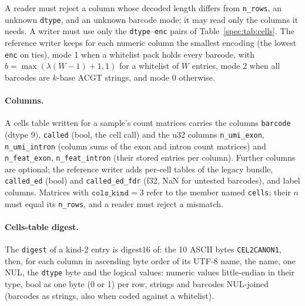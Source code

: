 A reader must reject a column whose decoded length differs from \texttt{n\_rows}, an unknown \texttt{dtype}, and an
unknown barcode mode; it may read only the columns it needs. A writer must use only the \texttt{dtype}--\texttt{enc}
pairs of Table~\ref{spec:tab:cells}. The reference writer keeps for each numeric column the smallest
encoding (the lowest \texttt{enc} on ties), mode 1 when a whitelist pack holds every barcode, with
$b=\max(\lambda(W-1)+1,1)$ for a whitelist of $W$ entries, mode 2 when all barcodes are $k$-base ACGT strings, and
mode 0 otherwise.

\paragraph{Columns.}
A cells table written for a sample's count matrices carries the columns \texttt{barcode} (dtype 9), \texttt{called}
(bool, the cell call) and the u32 columns \texttt{n\_umi\_exon}, \texttt{n\_umi\_intron} (column sums of the exon and
intron count matrices) and \texttt{n\_feat\_exon}, \texttt{n\_feat\_intron} (their stored entries per column). Further
columns are optional; the reference writer adds per-cell tables of the legacy bundle, \texttt{called\_ed} (bool) and
\texttt{called\_ed\_fdr} (f32, NaN for untested barcodes), and label columns. Matrices with $\texttt{cols\_kind}=3$
refer to the member named \texttt{cells}; their $n$ must equal its \texttt{n\_rows}, and a reader must reject a mismatch.

\paragraph{Cells-table digest.}
The \texttt{digest} of a kind-2 entry is $\mathrm{digest16}$ of: the 10 ASCII bytes \texttt{CEL2CANON1}, then, for each
column in ascending byte order of its UTF-8 name, the name, one NUL, the \texttt{dtype} byte and the logical values:
numeric values little-endian in their type, bool as one byte (0 or 1) per row, strings and barcodes NUL-joined (barcodes
as strings, also when coded against a whitelist).

